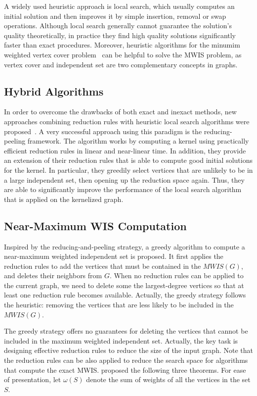 \documentclass[sigconf, nonacm]{acmart}
\begin{document}
A widely used heuristic approach is local search, which usually computes an initial solution and then improves it by simple insertion, removal or swap operations. Although local search generally cannot guarantee the solution’s quality theoretically, in practice they find high quality solutions significantly faster than exact procedures. Moreover, heuristic algorithms for the minumim weighted vertex cover problem~\cite{2018Improving,2017An} can be helpful to solve the MWIS problem, as vertex cover and independent set are two complementary concepts in graphs.

\subsection{Hybrid Algorithms}

In order to overcome the drawbacks of both exact and inexact methods, new approaches combining reduction rules with heuristic local search algorithms were proposed~\cite{Lamm0SWZ19}. A very successful approach using this paradigm is the reducing-peeling framework. The algorithm works by computing a kernel using practically efficient reduction rules in linear and near-linear time. In addition, they provide an extension of their reduction rules that is able to compute good initial solutions for the kernel. In particular, they greedily select vertices that are unlikely to be in a large independent set, then opening up the reduction space again. Thus, they are able to significantly improve the performance of the local search algorithm that is applied on the kernelized graph.

\subsection{Near-Maximum WIS Computation}

Inspired by the reducing-and-peeling strategy, a greedy algorithm to compute a near-maximum weighted independent set is proposed. It first applies the reduction rules to add the vertices that must be contained in the $MWIS(G)$, and deletes their neighbors from $G$. When no reduction rules can be applied to the current graph, we need to delete some the largest-degree vertices so that at least one reduction rule becomes available. Actually, the greedy strategy follows the heuristic: removing the vertices that are less likely to be included in the $MWIS(G)$.

The greedy strategy offers no guarantees for deleting the vertices that cannot be included in the maximum weighted independent set. Actually, the key task is designing effective reduction rules to reduce the size of the input graph. Note that the reduction rules can be also applied to reduce the search space for algorithms that compute the exact MWIS. \citet{Zheng:2020aa} proposed the following three theorems. For ease of presentation, let $\omega(S)$ denote the sum of weights of all the vertices in the set $S$.
\end{document}
